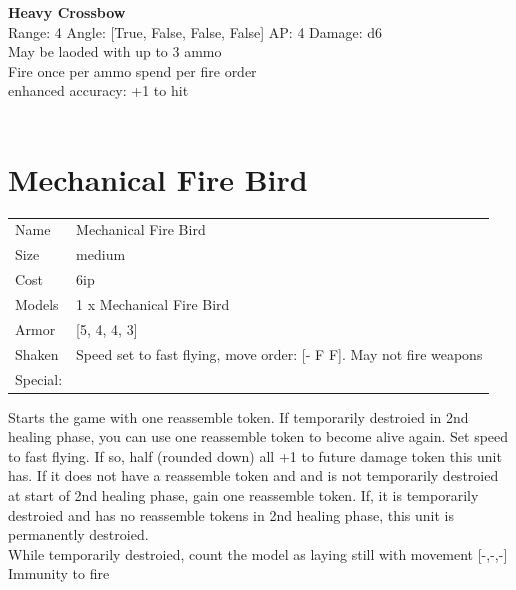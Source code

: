 {\bf Heavy Crossbow } \\



Range: 4  Angle: [True, False, False, False] AP: 4 Damage: d6 \\
May be laoded with up to 3 ammo\\ 
Fire once per ammo spend per fire order\\ 
enhanced accuracy: +1 to hit\\ 




 
\ \\













\clearpage

\section{ Mechanical Fire Bird }

\begin{tabular}{ll}
  Name & Mechanical Fire Bird \\
  Size & medium\\
  Cost & 6ip\\
  Models & 1 x Mechanical Fire Bird\\
  Armor & [5, 4, 4, 3]\\
  Shaken & Speed set to fast flying, move order: [- F F]. May not fire weapons\\
  Special: \\
\end{tabular}

\noindent Starts the game with one reassemble token. If temporarily destroied in 2nd healing phase, you can use one reassemble token to become alive again. Set speed to fast flying. If so, half (rounded down) all +1 to future damage token this unit has. If it does not have a reassemble token and and is not temporarily destroied at start of 2nd healing phase, gain one reassemble token. If, it is temporarily destroied and has no reassemble tokens in 2nd healing phase, this unit is permanently destroied.\\ 
While temporarily destroied, count the model as laying still with movement [-,-,-]\\ 
Immunity to fire\\ 


